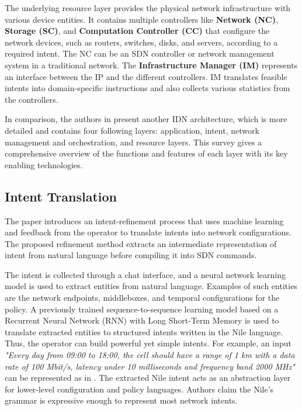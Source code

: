 The underlying resource layer provides the physical network infrastructure with various device entities. It contains multiple controllers like \textbf{Network (NC)}, \textbf{Storage (SC)}, and \textbf{Computation Controller (CC)} that configure the network devices, such as routers, switches, disks, and servers, according to a required intent. The NC can be an SDN controller or network management system in a traditional network. The \textbf{Infrastructure Manager (IM)} represents an interface between the IP and the different controllers. IM translates feasible intents into domain-specific instructions and also collects various statistics from the controllers.

In comparison, the authors in \cite[13]{Mehmood2021} present another IDN architecture, which is more detailed and contains four following layers: application, intent, network management and orchestration, and resource layers. This survey gives a comprehensive overview of the functions and features of each layer with its key enabling technologies.


\subsection{Intent Translation}

The paper \cite{Jacobs2018} introduces an intent-refinement process that uses machine learning and feedback from the operator to translate intents into network configurations. The proposed refinement method extracts an intermediate representation of intent from natural language before compiling it into SDN commands.

The intent is collected through a chat interface, and a neural network learning model is used to extract entities from natural language. Examples of such entities are the network endpoints, middleboxes, and temporal configurations for the policy. A previously trained sequence-to-sequence learning model based on a Recurrent Neural Network (RNN) with Long Short-Term Memory is used to translate extracted entities to structured intents written in the Nile language. Thus, the operator can build powerful yet simple intents. For example, an input \textit{"Every day from 09:00 to 18:00, the cell should have a range of 1 km with a data rate of 100 Mbit/s, latency under 10 milliseconds and frequency band 2000 MHz"} can be represented as in . The extracted Nile intent acts as an abstraction layer for lower-level configuration and policy languages. Authors claim the Nile's grammar is expressive enough to represent most network intents.

